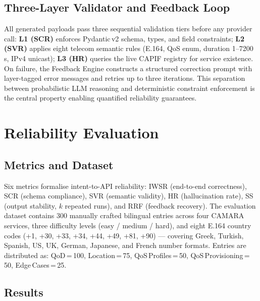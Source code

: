 \documentclass[conference]{IEEEtran}
\begin{document}
\subsection{Three-Layer Validator and Feedback Loop}

All generated payloads pass three sequential validation tiers before
any provider call:
\textbf{L1 (SCR)} enforces Pydantic\,v2 schema, types, and field constraints;
\textbf{L2 (SVR)} applies eight telecom semantic rules (E.164, QoS enum,
duration 1--7200\,s, IPv4 unicast);
\textbf{L3 (HR)} queries the live CAPIF registry for service existence.
On failure, the Feedback Engine constructs a structured correction prompt
with layer-tagged error messages and retries up to three iterations.
This separation between probabilistic LLM reasoning and deterministic
constraint enforcement is the central property enabling quantified
reliability guarantees.

\section{Reliability Evaluation}
\label{sec:eval}

\subsection{Metrics and Dataset}

Six metrics formalise intent-to-API reliability:
IWSR (end-to-end correctness), SCR (schema compliance), SVR (semantic
validity), HR (hallucination rate), SS (output stability, $k$ repeated
runs), and RRF (feedback recovery).
The evaluation dataset contains 300 manually crafted bilingual entries
across four CAMARA services, three difficulty levels (easy / medium /
hard), and eight E.164 country codes (+1, +30, +33, +34, +44, +49,
+81, +90) — covering Greek, Turkish, Spanish, US, UK, German, Japanese,
and French number formats.
Entries are distributed as: QoD\,=\,100, Location\,=\,75,
QoS\,Profiles\,=\,50, QoS\,Provisioning\,=\,50, Edge\,Cases\,=\,25.

\subsection{Results}
\end{document}
